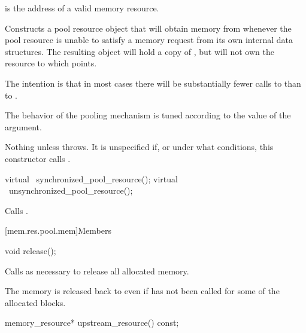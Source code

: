 \begin{itemdescr}
\pnum
\expects
{} is the address of a valid memory resource.

\pnum
\effects
Constructs a pool resource object that will obtain memory from 
whenever the pool resource is unable to satisfy a memory request
from its own internal data structures.
The resulting object will hold a copy of ,
but will not own the resource to which  points.
\begin{note}
The intention is that in most cases there will be substantially fewer
calls to  than to .
\end{note}
The behavior of the pooling mechanism is tuned
according to the value of the  argument.

\pnum
\throws
Nothing unless  throws.
It is unspecified if, or under what conditions,
this constructor calls .
\end{itemdescr}

%
%
\begin{itemdecl}
virtual ~synchronized_pool_resource();
virtual ~unsynchronized_pool_resource();
\end{itemdecl}

\begin{itemdescr}
\pnum
\effects
Calls .
\end{itemdescr}

[mem.res.pool.mem]{Members}

%
%
\begin{itemdecl}
void release();
\end{itemdecl}

\begin{itemdescr}
\pnum
\effects
Calls  as necessary
to release all allocated memory.
\begin{note}
The memory is released back to 
even if  has not been called
for some of the allocated blocks.
\end{note}
\end{itemdescr}

%
%
\begin{itemdecl}
memory_resource* upstream_resource() const;
\end{itemdecl}

